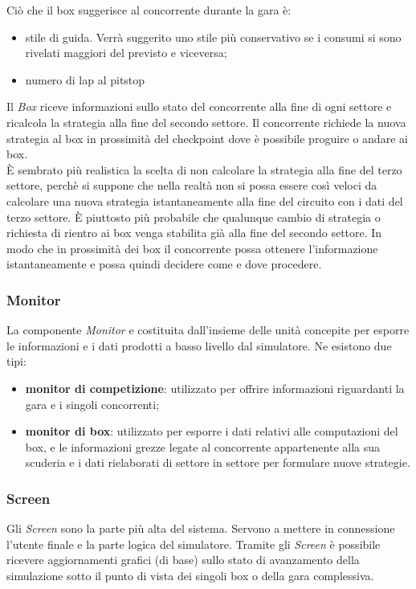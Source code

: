 Ci\`{o} che il box suggerisce al concorrente durante la gara \`{e}:
	\begin{itemize}
		\item stile di guida. Verr\`{a} suggerito uno stile pi\`{u} conservativo se i consumi si sono rivelati maggiori del previsto e viceversa;
		\item numero di lap al pitstop
	\end{itemize}
Il \emph{Box} riceve informazioni sullo stato del concorrente alla fine di ogni settore e ricalcola la strategia alla fine del secondo settore. Il concorrente
richiede la nuova strategia al box in prossimit\`{a} del checkpoint dove \`{e} possibile proguire o andare ai box.\\
\`{E} sembrato pi\`{u} realistica la scelta di non calcolare la strategia alla fine del terzo settore, perch\`{e} si suppone che nella realt\`{a} non si possa essere
cos\`{i} veloci da calcolare una nuova strategia istantaneamente alla fine del circuito con i dati del terzo settore. \`{E} piuttosto pi\`{u} probabile che 
qualunque cambio di strategia o richiesta di rientro ai box venga stabilita gi\`{a} alla fine del secondo settore. In modo che in prossimit\`{a} dei box il concorrente
possa ottenere l'informazione istantaneamente e possa quindi decidere come e dove procedere.
\subsubsection{Monitor}
La componente \emph{Monitor} e costituita dall'insieme delle unit\`{a} concepite per esporre le informazioni e i dati prodotti a basso livello
dal simulatore. Ne esistono due tipi:
\begin{itemize}
	\item \textbf{monitor di competizione}: utilizzato per offrire informazioni riguardanti la gara e i singoli concorrenti;
	\item \textbf{monitor di box}: utilizzato per esporre i dati relativi alle computazioni del box, e le informazioni grezze legate al
		concorrente appartenente alla sua scuderia e i dati rielaborati di settore in settore per formulare nuove strategie.
\end{itemize}
\subsubsection{Screen} 
Gli \emph{Screen} sono la parte pi\`{u} alta del sistema. Servono a mettere in connessione l'utente finale e la parte logica del simulatore.
Tramite gli \emph{Screen} \`{e} possibile ricevere aggiornamenti grafici (di base) sullo stato di avanzamento della simulazione sotto il punto di vista 
dei singoli box o della gara complessiva.
